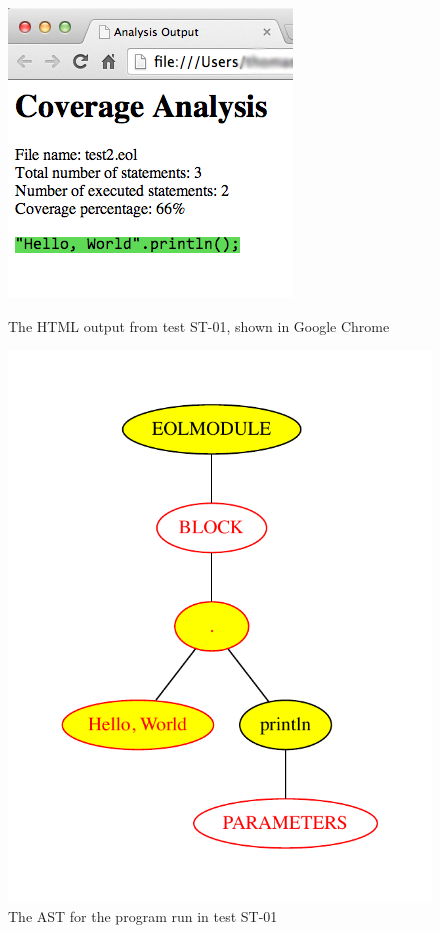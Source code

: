 \begin{figure}
\centering
\begin{minipage}[b]{.44\textwidth}
  \centering
  \includegraphics[width=0.6\linewidth]{figures/ST01HTML.png}
  \caption{The HTML output from test ST-01, shown in Google Chrome}
  \label{fig:ST01HTML}
\end{minipage}%
\begin{minipage}[b]{.1\textwidth}
\hspace{3.00mm}
\end{minipage}
\begin{minipage}[b]{.44\textwidth}
  \centering
  \includegraphics[width=0.6\linewidth]{figures/ST01AST.pdf}
  \caption{The AST for the program run in test ST-01}
  \label{fig:ST01AST}
\end{minipage}
\end{figure}

